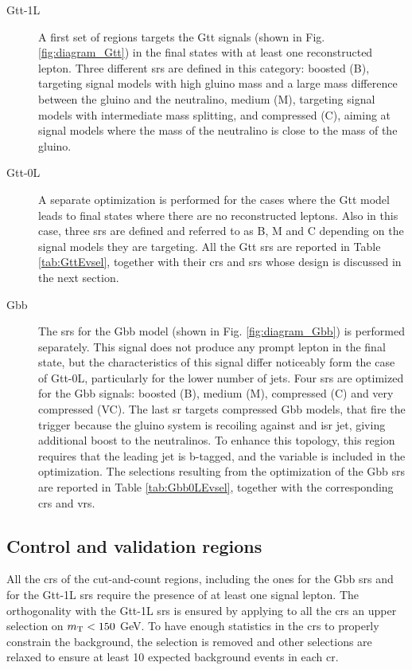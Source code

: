 \begin{description}

\item[Gtt-1L] A first set of regions targets the Gtt signals (shown in Fig. \ref{fig:diagram_Gtt}) in the final states with at least one reconstructed lepton. Three different \glspl{sr} are defined in this category: boosted (B), targeting signal models with high gluino mass 
and a large mass difference between the gluino and the neutralino, medium (M), targeting signal models with intermediate mass splitting, and compressed (C), aiming at signal models where the mass of the neutralino is close to the mass of the gluino. 

\item[Gtt-0L] A separate optimization is performed for the cases where the Gtt model leads to final states where there are no reconstructed leptons.
Also in this case, three \glspl{sr} are defined and referred to as B, M and C depending on the signal models they are targeting. 
All the Gtt \glspl{sr} are reported in Table \ref{tab:GttEvsel}, together with their \glspl{cr} and \glspl{sr} whose design is discussed in the next section. 

\item[Gbb] The \glspl{sr} for the Gbb model (shown in Fig. \ref{fig:diagram_Gbb}) is performed separately. 
This signal does not produce any prompt lepton in the final state, but the characteristics of this signal differ noticeably form 
the case of Gtt-0L, particularly for the lower number of jets. 
Four \glspl{sr} are optimized for the Gbb signals: boosted (B), medium (M), compressed (C) and very compressed (VC). 
The last \gls{sr} targets compressed Gbb models, that fire the \met trigger because the gluino system is recoiling against 
and \gls{isr} jet, giving additional boost to the neutralinos. To enhance this topology, this region requires that the leading jet is b-tagged, and 
the variable \dphilead is included in the optimization. The selections resulting from the optimization of the Gbb \glspl{sr} are 
reported in Table \ref{tab:Gbb0LEvsel}, together with the corresponding \glspl{cr} and \glspl{vr}.

\end{description}

\subsection{Control and validation regions}

All the \glspl{cr} of the cut-and-count regions, including the ones for the Gbb \glspl{sr} and for the Gtt-1L \glspl{sr}
require the presence of at least one signal lepton. 
The orthogonality with the Gtt-1L \glspl{sr} is ensured by applying to all the \glspl{cr} an upper selection on $m_\mathrm{T} < 150$ GeV.
To have enough statistics in the \glspl{cr} to properly constrain the \ttbar background, the 
\mtb selection is removed and other selections are relaxed to ensure at least 10 expected background events in each \gls{cr}.

